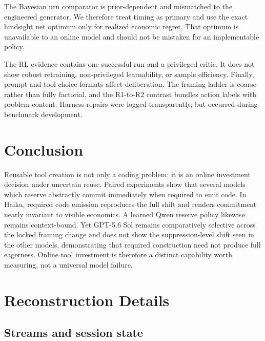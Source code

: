 \documentclass{article}
\begin{document}
The Bayesian urn comparator is prior-dependent and mismatched to the engineered
generator. We therefore treat timing as primary and use the exact hindsight
net optimum only for realized economic regret. That optimum is unavailable to
an online model and should not be mistaken for an implementable policy.

The RL evidence contains one successful run and a privileged critic. It does
not show robust retraining, non-privileged learnability, or sample efficiency.
Finally, prompt and tool-choice formats affect deliberation. The framing ladder
is coarse rather than fully factorial, and the R1-to-R2 contrast bundles action
labels with problem content. Harness repairs were logged transparently, but
occurred during benchmark development.

\section{Conclusion}

Reusable tool creation is not only a coding problem; it is an online investment
decision under uncertain reuse. Paired experiments show that several models
which reserve abstractly commit immediately when required to emit code. In
Haiku, required code emission reproduces the full shift and renders commitment
nearly invariant to visible economics. A learned Qwen reserve policy likewise
remains context-bound. Yet GPT-5.6 Sol remains comparatively selective across
the locked framing change and does not show the suppression-level shift seen in
the other models, demonstrating that required construction need not produce
full eagerness. Online tool investment is therefore a distinct
capability worth measuring, not a universal model failure.



\appendix

\section{Reconstruction Details}
\label{app:reconstruction}

\subsection{Streams and session state}
\end{document}
